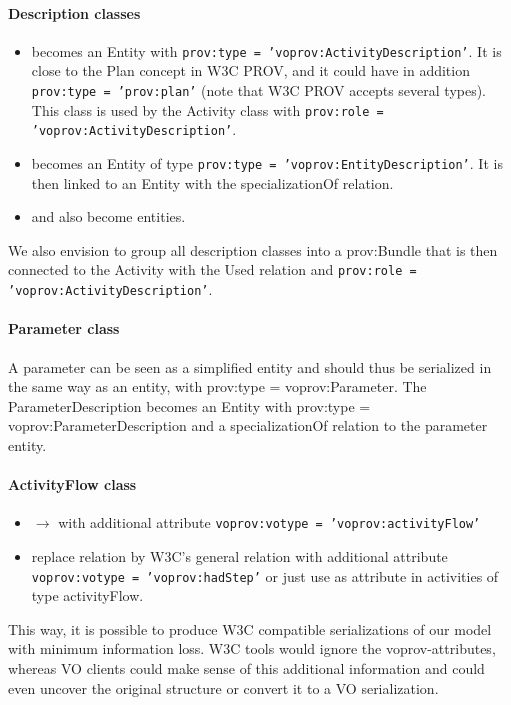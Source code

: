 \paragraph{Description classes}
\begin{itemize}
\item {} becomes an Entity with \texttt{prov:type = 'voprov:ActivityDescription'}. It is close to the Plan concept in W3C PROV, and it could have in addition \texttt{prov:type = 'prov:plan'} (note that W3C PROV accepts several types). This class is used by the Activity class with \texttt{prov:role = 'voprov:ActivityDescription'}.
\item {} becomes an Entity of type \texttt{prov:type = 'voprov:EntityDescription'}. It is then linked to an Entity with the specializationOf relation.
\item {} and  also become entities.
\end{itemize}
We also envision to group all description classes into a prov:Bundle that is then connected to the Activity with the Used relation and \texttt{prov:role = 'voprov:ActivityDescription'}.

\paragraph{Parameter class}

A parameter can be seen as a simplified entity and should thus be serialized in the same way as an entity, with prov:type = voprov:Parameter. The ParameterDescription becomes an Entity with prov:type = voprov:ParameterDescription and a specializationOf relation to the parameter entity.

\paragraph{ActivityFlow class}
\begin{itemize}
	\item {} $\rightarrow$  with additional attribute \texttt{voprov:votype = 'voprov:activityFlow'}
	\item replace  relation by W3C's general  relation with additional attribute \texttt{voprov:votype = 'voprov:hadStep'} or just use  as attribute in activities of type activityFlow.
\end{itemize}

This way, it is possible to produce W3C compatible serializations of our model with minimum information loss. W3C tools would ignore the voprov-attributes, whereas VO clients could make sense of this additional information and could even uncover the original structure or convert it to a VO serialization.
